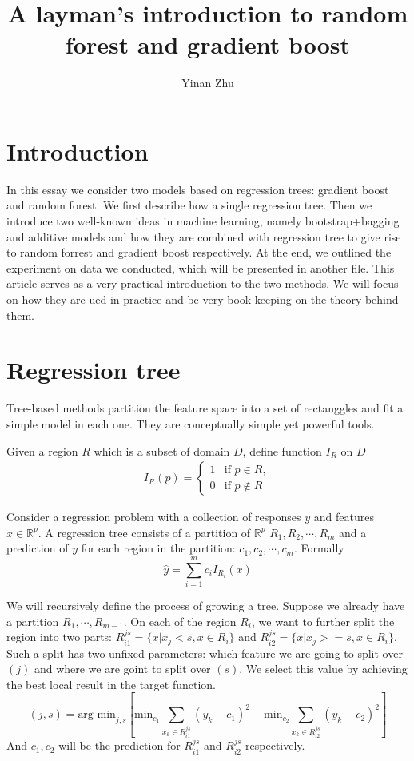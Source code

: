 \documentclass{article}
\title{A layman's introduction to random forest and gradient boost}
\author{Yinan Zhu}
\begin{document}
\section{Introduction}
In this essay we consider two models based on regression trees: gradient boost and random forest. We first describe how a single regression tree. Then we introduce two well-known ideas in machine learning, namely bootstrap+bagging and additive models and how they are combined with regression tree to give rise to random forrest and gradient boost respectively. At the end, we outlined the experiment on data we conducted, which will be presented in another file. This article serves as a very practical introduction to the two methods. We will focus on how they are ued in practice and be very book-keeping on the theory behind them.

\section{Regression tree}
Tree-based methods partition the feature space into a set of rectanggles and fit a simple model in each one. They are conceptually simple yet powerful tools.

Given a region $R$ which is a subset of domain $D$, define function $I_R$ on $D$ 
\begin{eqnarray}
I_R(p)= \left\{
\begin{array}{rl}
1 & \textrm{if } p \in R,\\
0 & \textrm{if } p \notin R
\end{array} \right.\nonumber
\end{eqnarray}

Consider a regression problem with a collection of responses $y$ and features $x\in \mathbb{R}^p$. A regression tree consists of a partition of $\mathbb{R}^p$ $R_1, R_2,\cdots,R_m$ and a prediction of $y$ for each region in the partition: $c_1,c_2,\cdots,c_m$. Formally
\[
\hat{y}=\sum_{i=1}^m c_iI_{R_i}(x)
\]

We will recursively define the process of growing a tree. Suppose we already have a partition $R_1,\cdots, R_{m-1}$. On each of the region $R_i$, we want to further split the region into two parts: $R_{i1}^{js}=\{x|x_j<s,x\in R_i\}$ and $R_{i2}^{js}=\{x|x_j>=s,x\in R_i\}$. Such a split has two unfixed parameters: which feature we are going to split over $(j)$ and where we are goint to split over $(s)$. We select this value by achieving the best local result in the target function.
\[
(j,s)=\textrm{arg min}_{j,s}[\textrm{min}_{c_1}\sum_{x_k\in R_{i1}^{js}}(y_k-c_1)^2+\textrm{min}_{c_2}\sum_{x_k\in R_{i2}^{js}}(y_k-c_2)^2]
\]
And $c_1, c_2$ will be the prediction for $R_{i1}^{js}$ and $R_{i2}^{js}$ respectively.
\end{document}
